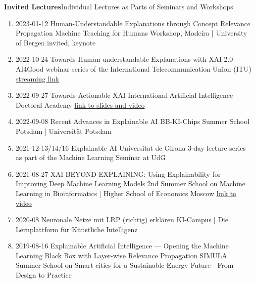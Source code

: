\headedsection
{\bf Invited Lectures}{Individual Lectures as Parts of Seminars and Workshops}
{
\begin{enumerate}
    \item {}
                    {2023-01-12}
                    {Human-Understandable Explanations through Concept Relevance Propagation}
                    {Machine Teaching for Humans Workshop, Madeira | University of Bergen}
                    {invited, keynote}
    \item {}
                    {2022-10-24}
                    {Towards Human-understandable Explanations with XAI 2.0}
                    {AI4Good webinar series of the International Telecommunication Union (ITU)}
                    {\href{https://www.youtube.com/watch?v=NiE13aBBx28}{streaming link}}
    \item {}
                    {2022-09-27}
                    {Towards Actionable XAI}
                    {International Artificial Intelligence Doctoral Academy}
                    {\href{https://www.i-aida.org/events/towards-actionable-xai-2/}{link to slides and video}}
    \item {}
                    {2022-09-08}
                    {Recent Advances in Explainable AI}
                    {BB-KI-Chips Summer School Potsdam | Universität Potsdam}
    \item {}
                    {2021-12-13/14/16}
                    {Explainable AI}
                    {Universitat de Girona}
                    {3-day lecture series as part of the Machine Learning Seminar at UdG}
    \item {}
                    {2021-08-27}
                    {XAI BEYOND EXPLAINING: Using Explainability for Improving Deep Machine Learning Models}
                    {2nd Summer School on Machine Learning in Bioinformatics | Higher School of Economics Moscow}
                    {\href{https://www.youtube.com/watch?v=fHBSLzJ4zbA}{link to video}}
    \item {}
                    {2020-08}
                    {Neuronale Netze mit LRP (richtig) erklären}
                    {KI-Campus | Die Lernplattform für Künstliche Intelligenz}
    \item {}
                    {2019-08-16}
                    {Explainable Artificial Intelligence --- Opening the Machine Learning Black Box with Layer-wise Relevance Propagation}
                    {SIMULA Summer School on Smart cities for a Sustainable Energy Future - From Design to Practice}
\end{enumerate}
}